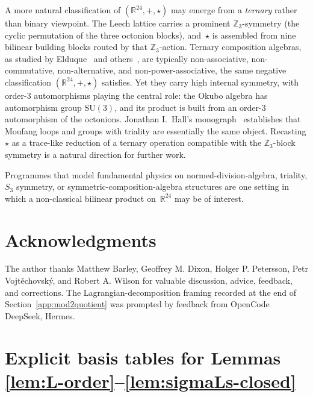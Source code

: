 \documentclass[twoside,english]{paper}
\numberwithin{equation}{section}
\numberwithin{figure}{section}
\theoremstyle{definition}
\theoremstyle{remark}
\newcommand{\RR}{\mathbb{R}}
\newcommand{\ZZ}{\mathbb{Z}}
\begin{document}
A more natural classification of $(\RR^{24}, +, \star)$ may emerge
from a \emph{ternary} rather than binary viewpoint.  The Leech lattice
carries a prominent $\ZZ_3$-symmetry (the cyclic permutation of the
three octonion blocks), and~$\star$ is assembled from nine bilinear
building blocks routed by that $\ZZ_3$-action.  Ternary composition
algebras, as studied by
Elduque~\cite{Elduque1996,Elduque2000_Triality,Elduque2023_IsotropicNorm}
and others~\cite{SmithVojtechovsky2022,KamiyaOkubo2015,Okubo1995_Book},
are typically non-associative, non-commutative, non-alternative, and
non-power-associative, the same negative classification $(\RR^{24},
+, \star)$ satisfies.  Yet they carry high internal symmetry, with
order-3 automorphisms playing the central role: the Okubo algebra has
automorphism group $\mathrm{SU}(3)$, and its product is built from an
order-3 automorphism of the octonions.  Jonathan I.~Hall's
monograph~\cite{Hall2019_Moufang} establishes that Moufang loops and
groups with triality are essentially the same object.  Recasting
$\star$ as a trace-like reduction of a ternary operation compatible
with the $\ZZ_3$-block symmetry is a natural direction for further
work.

Programmes that model fundamental physics on normed-division-algebra,
triality, $S_3$ symmetry, or symmetric-composition-algebra structures
\cite{GresnigtGourlayVarma2023, Koeplinger2023,
FureyHughes2025_TrioOfTrialities, MarraniCorradettiZucconi2025}
are one setting in which a non-classical bilinear product on~$\RR^{24}$
may be of interest.

\section*{Acknowledgments}

The author thanks Matthew Barley, Geoffrey M. Dixon, Holger P.
Petersson, Petr Vojt\v{e}chovsk\'{y}, and Robert A. Wilson for
valuable discussion, advice, feedback, and corrections.  The Lagrangian-decomposition
framing recorded at the end of
Section~\ref{app:mod2quotient} was prompted by feedback from
OpenCode DeepSeek, Hermes.

\appendix
\section{Explicit basis tables for Lemmas
\ref{lem:L-order}--\ref{lem:sigmaLs-closed}}\label{sec:appendix-tables}
\end{document}
